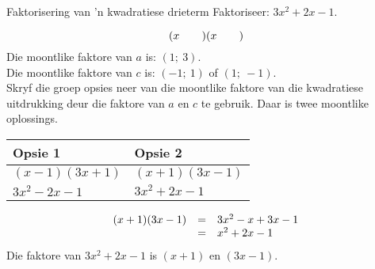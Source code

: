 \begin{wex}{Faktorisering van ’n kwadratiese drieterm}
{Faktoriseer: $3{x}^{2}+2x-1$.} 
{
\begin{equation*}
(x\phantom{\rule{2.em}{0ex}})(x\phantom{\rule{2.em}{0ex}})
\end{equation*}
Die moontlike faktore van $a$ is: $(1;~3)$.\\
Die moontlike faktore van $c$ is: $(-1;~1)$ of $(1;~-1)$.\\
Skryf die groep opsies neer van die moontlike faktore van die kwadratiese uitdrukking deur die faktore van $a$ en $c$ te gebruik.
Daar is twee moontlike oplossings.\par 

\begin{table}[H]
\begin{center}
\label{m39394*id277097}
\noindent

\begin{tabular}{|l|l|}\hline
\textbf{Opsie 1} &
\textbf{Opsie 2}%
\\ \hline
$(x-1)(3x+1)$
&
$(x+1)(3x-1)$
\\ \hline
$3{x}^{2}-2x-1$
&
\uline{
$3{x}^{2}+2x-1$
}
\\ \hline
\end{tabular}
\end{center}
\end{table}

\begin{equation*}
\begin{array}{ccl}  
(x+1)(3x-1)& =& 3{x}^{2}-x+3x-1\hfill \\ & =& {x}^{2}+2x-1\end{array}
\end{equation*}
Die faktore van $3{x}^{2}+2x-1$ is $(x+1)$ en $(3x-1)$.
}
\end{wex}


